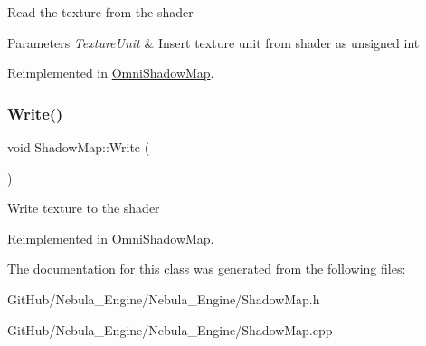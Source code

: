 Read the texture from the shader 
\begin{DoxyParams}{Parameters}
{\em Texture\+Unit} & Insert texture unit from shader as unsigned int \\
\hline
\end{DoxyParams}


Reimplemented in \mbox{\hyperlink{class_omni_shadow_map_ae2c39deb32f33b8c6f461f4525a1d552}{Omni\+Shadow\+Map}}.

\mbox{\label{class_shadow_map_abfaac01d19680e016042dacee5a5910e}} 
\subsubsection{\texorpdfstring{Write()}{Write()}}
{\footnotesize\ttfamily void Shadow\+Map\+::\+Write (\begin{DoxyParamCaption}{ }\end{DoxyParamCaption})\hspace{0.3cm}{\ttfamily [virtual]}}

Write texture to the shader 

Reimplemented in \mbox{\hyperlink{class_omni_shadow_map_aafd4e0d6b4cf265b59c67585c35622de}{Omni\+Shadow\+Map}}.



The documentation for this class was generated from the following files\+:\begin{DoxyCompactItemize}
\item 
Git\+Hub/\+Nebula\+\_\+\+Engine/\+Nebula\+\_\+\+Engine/Shadow\+Map.\+h\item 
Git\+Hub/\+Nebula\+\_\+\+Engine/\+Nebula\+\_\+\+Engine/Shadow\+Map.\+cpp\end{DoxyCompactItemize}

